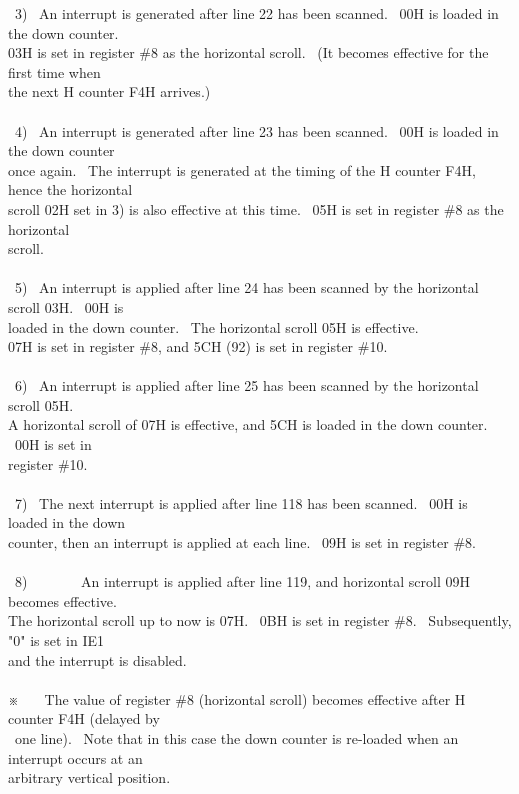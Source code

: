 \documentclass[a4paper,10pt]{article}
\begin{document}
\newpage

\noindent \ 3) \ An interrupt is generated after line 22 has been scanned. \ 00H is loaded in the down counter.\\
03H is set in register \#8 as the horizontal scroll. \ (It becomes effective for the first time when\\
the next H counter F4H arrives.)\\
\\
\phantom \ 4) \ An interrupt is generated after line 23 has been scanned. \ 00H is loaded in the down counter\\
once again. \ The interrupt is generated at the timing of the H counter F4H, hence the horizontal\\
scroll 02H set in 3) is also effective at this time. \ 05H is set in register \#8 as the horizontal\\
scroll.\\
\\
\phantom \ 5) \ An interrupt is applied after line 24 has been scanned by the horizontal scroll 03H. \ 00H is\\
loaded in the down counter. \ The horizontal scroll 05H is effective.\\
07H is set in register \#8, and 5CH (92) is set in register \#10.\\
\\
\phantom \ 6) \ An interrupt is applied after line 25 has been scanned by the horizontal scroll 05H.\\
A horizontal scroll of 07H is effective, and 5CH is loaded in the down counter. \ 00H is set in\\
register \#10.\\
\\
\phantom \ 7) \ The next interrupt is applied after line 118 has been scanned. \ 00H is loaded in the down\\
counter, then an interrupt is applied at each line. \ 09H is set in register \#8.\\
\\
\phantom \ 8) \ \ \ \ \ \ \ An interrupt is applied after line 119, and horizontal scroll 09H becomes effective.\\
The horizontal scroll up to now is 07H. \ 0BH is set in register \#8. \ Subsequently, "0" is set in IE1\\
and the interrupt is disabled.\\
\\
※ \ \ \ The value of register \#8 (horizontal scroll) becomes effective after H counter F4H (delayed by\\
\phantom \ one line). \ Note that in this case the down counter is re-loaded when an interrupt occurs at an\\
arbitrary vertical position.
\end{document}
